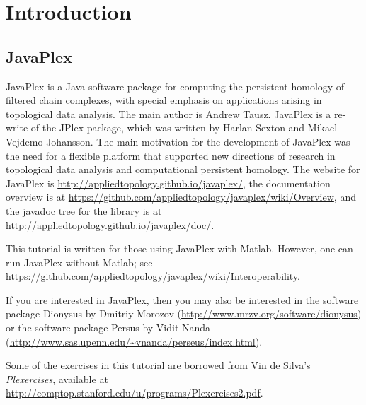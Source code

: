\documentclass[amscd, amssymb, verbatim]{amsart}[12pt]
\theoremstyle{remark}
\theoremstyle{remark}
\theoremstyle{remark}
\begin{document}






\section{Introduction}


\subsection{JavaPlex}

JavaPlex is a Java software package for computing the persistent homology of filtered chain complexes, with special emphasis on applications arising in topological data analysis. The main author is Andrew Tausz. JavaPlex is a re-write of the JPlex package, which was written by Harlan Sexton and Mikael Vejdemo Johansson. The main motivation for the development of JavaPlex was the need for a flexible platform that supported new directions of research in topological data analysis and computational persistent homology. The website for JavaPlex is \url{http://appliedtopology.github.io/javaplex/}, the documentation overview is at \url{https://github.com/appliedtopology/javaplex/wiki/Overview}, and the javadoc tree for the library is at \url{http://appliedtopology.github.io/javaplex/doc/}.

This tutorial is written for those using JavaPlex with Matlab. However, one can run JavaPlex without Matlab; see \url{https://github.com/appliedtopology/javaplex/wiki/Interoperability}.

If you are interested in JavaPlex, then you may also be interested in the software package Dionysus by Dmitriy Morozov (\url{http://www.mrzv.org/software/dionysus}) or the software package Persus by Vidit Nanda (\url{http://www.sas.upenn.edu/~vnanda/perseus/index.html}).

Some of the exercises in this tutorial are borrowed from Vin de Silva's {\em Plexercises}, available at \url{http://comptop.stanford.edu/u/programs/Plexercises2.pdf}.
\end{document}
